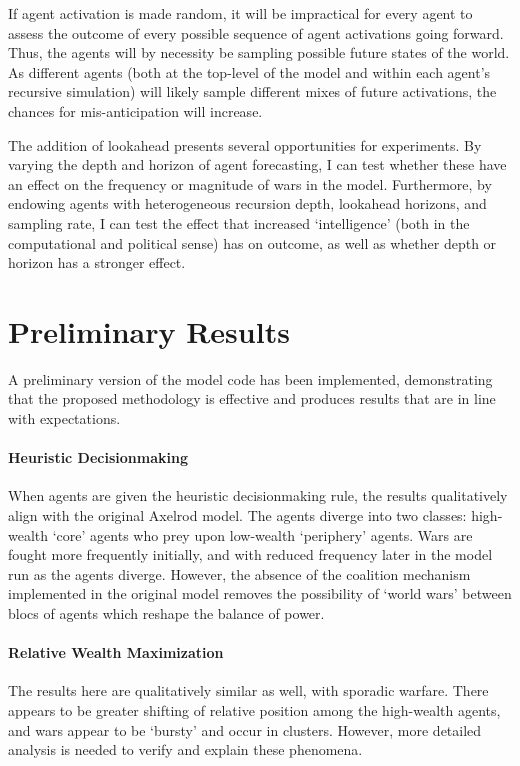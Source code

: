 \documentclass{article}
\begin{document}
If agent activation is made random, it will be impractical for every agent to assess the outcome of every possible sequence of agent activations going forward. Thus, the agents will by necessity be sampling possible future states of the world. As different agents (both at the top-level of the model and within each agent's recursive simulation) will likely sample different mixes of future activations, the chances for mis-anticipation will increase.

The addition of lookahead presents several opportunities for experiments. By varying the depth and horizon of agent forecasting, I can test whether these have an effect on the frequency or magnitude of wars in the model. Furthermore, by endowing agents with heterogeneous recursion depth, lookahead horizons, and sampling rate, I can test the effect that increased `intelligence' (both in the computational and political sense) has on outcome, as well as whether depth or horizon has a stronger effect. 

\section{Preliminary Results}

A preliminary version of the model code has been implemented, demonstrating that the proposed methodology is effective and produces results that are in line with expectations.

\paragraph{Heuristic Decisionmaking}
When agents are given the heuristic decisionmaking rule, the results qualitatively align with the original Axelrod model. The agents diverge into two classes: high-wealth `core' agents who prey upon low-wealth `periphery' agents. Wars are fought more frequently initially, and with reduced frequency later in the model run as the agents diverge. However, the absence of the coalition mechanism implemented in the original model removes the possibility of `world wars' between blocs of agents which reshape the balance of power.

\paragraph{Relative Wealth Maximization}

The results here are qualitatively similar as well, with sporadic warfare. There appears to be greater shifting of relative position among the high-wealth agents, and wars appear to be `bursty' and occur in clusters. However, more detailed analysis is needed to verify and explain these phenomena.
\end{document}
